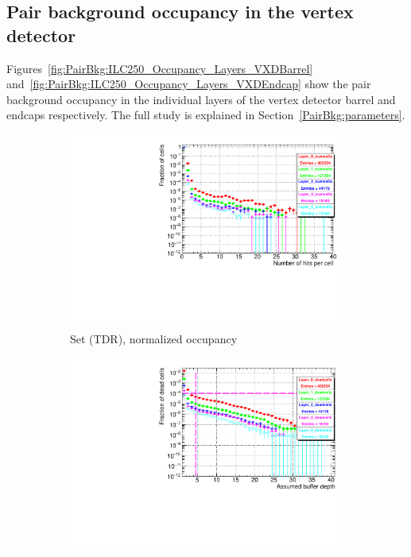 \subsection{Pair background occupancy in the \sid vertex detector}
Figures~\ref{fig:PairBkg:ILC250_Occupancy_Layers_VXDBarrel} and~\ref{fig:PairBkg:ILC250_Occupancy_Layers_VXDEndcap} show the pair background occupancy in the individual layers of the \sid vertex detector barrel and endcaps respectively.
The full study is explained in Section~\ref{PairBkg:parameters}.
\begin{figure}[htbp]
 \centering
   \begin{subfigure}[b]{0.49\textwidth}
   \centering
    \includegraphics[width=\textwidth]{Figures/Pairs/Appendix/occupancy_numcells_SiVertexBarrel_ILC250_TDR_corrected_Barrel_size.pdf}
   \caption{Set (TDR), normalized occupancy}
   \end{subfigure}
   \hfill
    \begin{subfigure}[b]{0.49\textwidth}
   \centering
    \includegraphics[width=\textwidth]{Figures/Pairs/Appendix/occupancy_deadcells_SiVertexBarrel_ILC250_TDR_corrected_Barrel_size.pdf}

\end{subfigure}
\end{figure}
